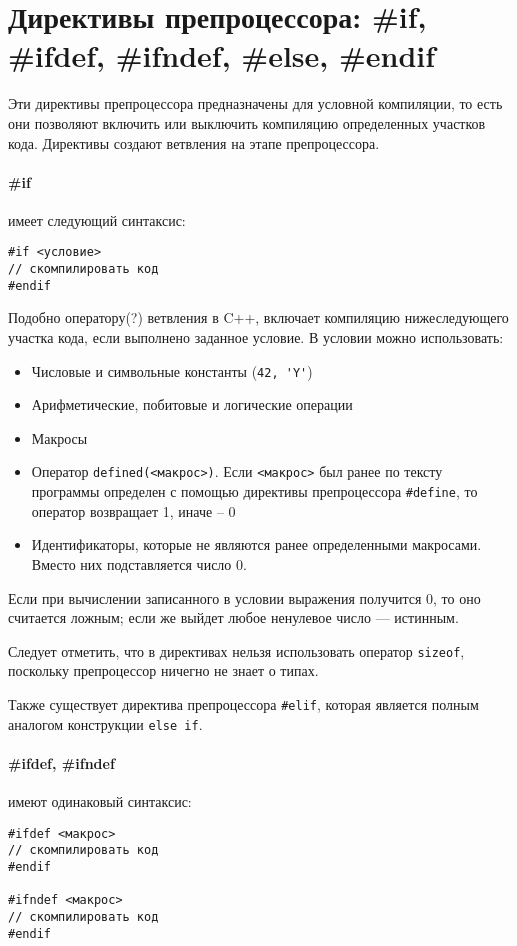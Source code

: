 \documentclass[14pt, a4paper]{extarticle}
\begin{document}
\section{Директивы препроцессора: \#if, \#ifdef, \#ifndef, \#else, \#endif}
Эти директивы препроцессора предназначены для условной компиляции, то есть они позволяют
включить или выключить компиляцию определенных участков кода. Директивы создают ветвления
на этапе препроцессора.

\paragraph{\#if} имеет следующий синтаксис:
\begin{verbatim}
#if <условие>
// скомпилировать код
#endif
\end{verbatim}
Подобно оператору(?) ветвления в C++, включает компиляцию нижеследующего
участка кода, если выполнено заданное условие. В условии можно использовать:
\begin{itemize}
  \item Числовые и символьные константы (\verb|42, 'Y'|)
  \item Арифметические, побитовые и логические операции
  \item Макросы
  \item Оператор \verb|defined(<макрос>)|. Если \verb|<макрос>| был ранее по тексту программы определен с помощью директивы препроцессора
  \verb|#define|, то оператор возвращает 1, иначе -- 0
  \item Идентификаторы, которые не являются ранее определенными макросами. Вместо них подставляется число 0.
\end{itemize}
Если при вычислении записанного в условии выражения получится 0, то оно считается ложным; если же выйдет любое ненулевое число --- истинным.

Следует отметить, что в директивах нельзя использовать оператор \verb|sizeof|, поскольку препроцессор ничегно не знает о типах.

Также существует директива препроцессора \verb|#elif|, которая является полным аналогом конструкции \verb|else if|.

\paragraph{\#ifdef, \#ifndef} имеют одинаковый синтаксис:
\begin{verbatim}
#ifdef <макрос>
// скомпилировать код
#endif

#ifndef <макрос>
// скомпилировать код
#endif
\end{verbatim}
\end{document}
